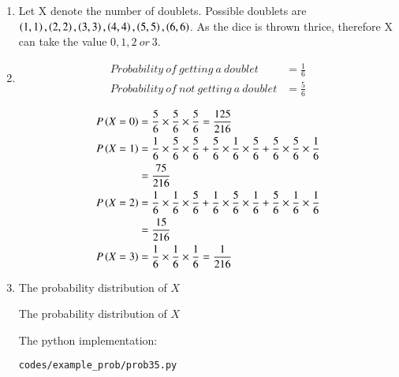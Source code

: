 \renewcommand{\theequation}{\theenumi}
\begin{enumerate}

\item Let X denote the number of doublets. Possible doublets are $\left(1, 1\right), \left(2, 2\right), \left(3, 3\right), \left(4, 4\right), \left(5, 5\right), \left(6, 6\right)$. As the dice is thrown thrice, therefore X can take the value $0, 1, 2 \ or \ 3$. 

\item
\begin{align}
Probability\  of\  getting\  a\  doublet  &=  \frac{1}{6}\\
Probability\  of\  not\  getting\  a\  doublet  &=  \frac{5}{6}
\end{align}

\begin{align*}
P\left(X=0\right) &= \frac{5}{6} \times \frac{5}{6} \times \frac{5}{6} = \frac{125}{216}\\
P\left(X=1\right) &= \frac{1}{6} \times \frac{5}{6} \times \frac{5}{6} + \frac{5}{6} \times \frac{1}{6} \times \frac{5}{6} + \frac{5}{6} \times \frac{5}{6} \times \frac{1}{6}\\
&= \frac{75}{216}\\
P\left(X=2\right) &= \frac{1}{6} \times \frac{1}{6} \times \frac{5}{6} + \frac{1}{6} \times \frac{5}{6} \times \frac{1}{6} + \frac{5}{6} \times \frac{1}{6} \times \frac{1}{6}\\
&= \frac{15}{216}\\
P\left(X=3\right) &= \frac{1}{6} \times \frac{1}{6} \times \frac{1}{6} = \frac{1}{216}
\end{align*}

\item The probability distribution of $X$ \\
\begin{table}[ht!]
\centering

\caption{The probability distribution of $X$}
\end{table} 


The python implementation:
\begin{lstlisting}
codes/example_prob/prob35.py
\end{lstlisting}

\end{enumerate}